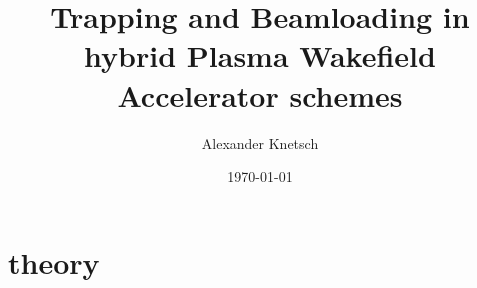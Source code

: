 \documentclass{thesis}
\title{Trapping and Beamloading in hybrid Plasma Wakefield Accelerator schemes}
\author{Alexander Knetsch}
\date{\today}
\begin{document}
\maketitle
\tableofcontents
\chapter{theory}

%
%

%
%


%    
\end{document}
